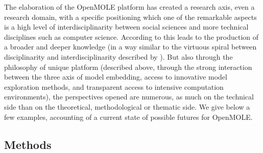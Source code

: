 \documentclass[10pt]{article}
\begin{document}
The elaboration of the OpenMOLE platform has created a research axis, even a research domain, with a specific positioning which one of the remarkable aspects is a high level of interdisciplinarity between social sciences and more technical disciplines such as computer science. According to \cite{banos2017knowledge} this leads to the production of a broader and deeper knowledge (in a way similar to the virtuous spiral between disciplinarity and interdisciplinarity described by \cite{banos2013pour}). But also through the philosophy of unique platform (described above, through the strong interaction between the three axis of model embedding, access to innovative model exploration methods, and transparent access to intensive computation environments), the perspectives opened are numerous, as much on the technical side than on the theoretical, methodological or thematic side. We give below a few examples, accounting of a current state of possible futures for OpenMOLE.


\subsection{Methods}
\end{document}
